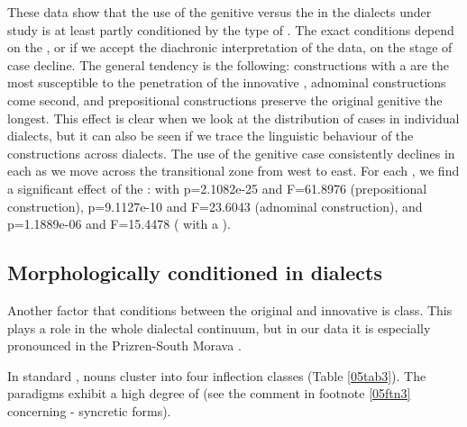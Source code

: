 \documentclass[output=paper,colorlinks,citecolor=brown]{langscibook}
\begin{document}
These data show that the use of the genitive versus the  in the  dialects under study is at least partly conditioned by the type of . The exact conditions depend on the , or if we accept the diachronic interpretation of the data, on the stage of case decline. The general tendency is the following: constructions with a  are the most susceptible to the penetration of the innovative , adnominal constructions come second, and prepositional constructions preserve the original genitive the longest. This effect is clear when we look at the distribution of cases in individual dialects, but it can also be seen if we trace the linguistic behaviour of the constructions across dialects. The use of the genitive case consistently declines in each  as we move across the transitional zone from west to east. For each , we find a significant effect of the : with p=2.1082e-25 and F=61.8976 (prepositional construction), p=9.1127e-10 and F=23.6043 (adnominal construction), and p=1.1889e-06 and F=15.4478 ( with a ).

\subsection{Morphologically conditioned  in  dialects} \label{05sec3.4}

Another factor that conditions  between the original  and innovative   is  class. This plays a role in the whole dialectal continuum, but in our data it is especially pronounced in the Prizren-South Morava .

In standard , nouns cluster into four inflection classes (Table \ref{05tab3}). The paradigms exhibit a high degree of  (see the comment in footnote \ref{05ftn3} concerning - syncretic forms).
\end{document}
